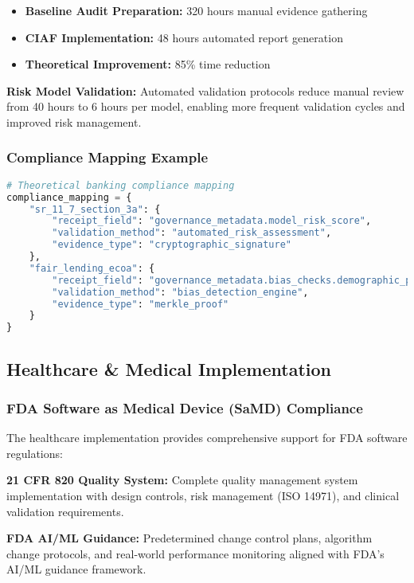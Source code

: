 \documentclass[12pt,a4paper]{article}
\begin{document}
\begin{itemize}
\item \textbf{Baseline Audit Preparation:} 320 hours manual evidence gathering
\item \textbf{CIAF Implementation:} 48 hours automated report generation
\item \textbf{Theoretical Improvement:} 85\% time reduction
\end{itemize}

\textbf{Risk Model Validation:} Automated validation protocols reduce manual review from 40 hours to 6 hours per model, enabling more frequent validation cycles and improved risk management.

\subsubsection{Compliance Mapping Example}

\begin{lstlisting}[language=Python, caption=Banking Compliance Mapping]
# Theoretical banking compliance mapping
compliance_mapping = {
    "sr_11_7_section_3a": {
        "receipt_field": "governance_metadata.model_risk_score",
        "validation_method": "automated_risk_assessment",
        "evidence_type": "cryptographic_signature"
    },
    "fair_lending_ecoa": {
        "receipt_field": "governance_metadata.bias_checks.demographic_parity",
        "validation_method": "bias_detection_engine",
        "evidence_type": "merkle_proof"
    }
}
\end{lstlisting}

\subsection{Healthcare \& Medical Implementation}

\subsubsection{FDA Software as Medical Device (SaMD) Compliance}

The healthcare implementation provides comprehensive support for FDA software regulations:

\textbf{21 CFR 820 Quality System:} Complete quality management system implementation with design controls, risk management (ISO 14971), and clinical validation requirements.

\textbf{FDA AI/ML Guidance:} Predetermined change control plans, algorithm change protocols, and real-world performance monitoring aligned with FDA's AI/ML guidance framework.
\end{document}
